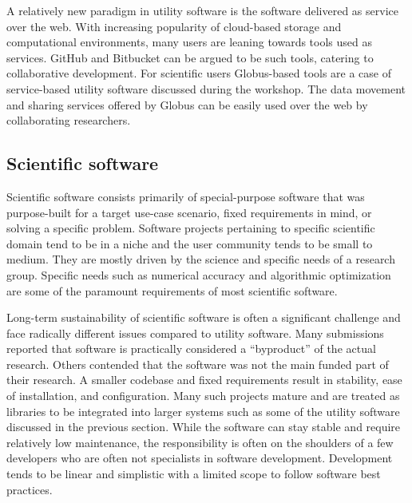 \documentclass[11pt, oneside]{amsart}
\newcommand{\note}[1]{ {\textcolor{red}    { #1 }}}
\newcommand{\toolname}[1] {\textsf{#1}}
\begin{document}
A relatively new paradigm in utility software is the software
delivered as service over the web. With increasing popularity of
cloud-based storage and computational environments, many users are
leaning towards tools used as services. \toolname{GitHub} and
\toolname{Bitbucket} can be argued to be such tools, catering to
collaborative development. For scientific users
\toolname{Globus}-based tools are a case of service-based utility
software discussed during the workshop. The data movement and sharing
services offered by \toolname{Globus} can be easily used over the web by
collaborating researchers.

\subsection{Scientific software}
Scientific software consists primarily of special-purpose software
that was purpose-built for a target use-case scenario, fixed 
requirements in mind, or solving a specific problem. Software projects
pertaining to specific scientific domain tend to be in a niche and the
user community tends to be small to medium. They are mostly driven by
the science and specific needs of a research group. Specific needs
such as numerical accuracy and algorithmic optimization are some of
the paramount requirements of most scientific software.

Long-term sustainability of scientific software is often a significant
challenge and face radically different issues compared to utility
software.  Many submissions reported that software is practically
considered a ``byproduct'' of the actual research. Others contended
that the software was not the main funded part of their research. A
smaller codebase and fixed requirements result in stability, ease of
installation, and configuration. Many such projects mature and are
treated as libraries to be integrated into larger systems such as some of
the utility software discussed in the previous section. While the
software can stay stable and require relatively low maintenance, the
responsibility is often on the shoulders of a few developers who
are often not specialists in software development. Development tends to
be linear and simplistic with a limited scope to follow software best
practices.
\end{document}
